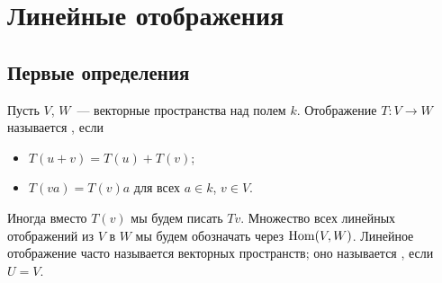 \section{Линейные отображения}

\subsection{Первые определения}


\begin{definition}
Пусть $V$, $W$~--- векторные пространства над полем $k$.
Отображение $T\colon V\to W$ называется ,
если
\begin{itemize}
\item $T(u+v)=T(u) + T(v)$;
\item $T(va) = T(v)a$ для всех $a\in k$, $v\in V$.
\end{itemize}
Иногда вместо $T(v)$ мы будем писать $Tv$.
Множество всех линейных отображений из $V$ в $W$ мы будем
обозначать через $\operatorname{Hom}(V,W)$.
Линейное отображение часто называется
 векторных
пространств; оно называется
, если $U=V$.
\end{definition}


